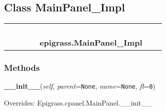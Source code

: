 
\subsection{Class MainPanel\_Impl}

    \label{epigrass:MainPanel_Impl}
\begin{tabular}{cccccccc}
\multicolumn{2}{r}{\settowidth{\BCL}{??-5}\multirow{2}{\BCL}{??-5}}
&&
&&
  \\\cline{3-3}
  &&\multicolumn{1}{c|}{}
&&
&&
  \\
\multicolumn{4}{r}{\settowidth{\BCL}{Epigrass.cpanel.MainPanel}\multirow{2}{\BCL}{Epigrass.cpanel.MainPanel}}
&&
  \\\cline{5-5}
  &&&&\multicolumn{1}{c|}{}
&&
  \\
&&&&\multicolumn{2}{l}{\textbf{epigrass.MainPanel\_Impl}}
\end{tabular}



  \subsubsection{Methods}

    \vspace{0.5ex}

    \begin{boxedminipage}{\textwidth}

    \raggedright \textbf{\_\_init\_\_}(\textit{self}, \textit{parent}=\texttt{None}, \textit{name}=\texttt{None}, \textit{fl}=\texttt{0})

      Overrides: Epigrass.cpanel.MainPanel.\_\_init\_\_

    \end{boxedminipage}

    \label{epigrass:MainPanel_Impl:initRc}

